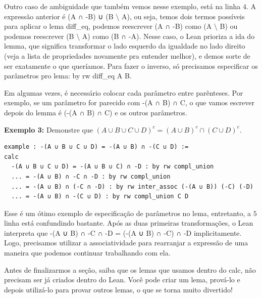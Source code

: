 Outro caso de ambiguidade que também vemos nesse exemplo, está na linha $4$. A expressão anterior é {\selectfont (A ∩ -B) ∪ (B $\setminus$ A)}, ou seja, temos dois termos possíveis para aplicar o lema {\selectfont diff\_eq}, podemos reescrever {\selectfont (A ∩ -B)} como {\selectfont (A $\setminus$ B)} ou podemos reescrever  {\selectfont (B $\setminus$ A)} como {\selectfont (B ∩ -A)}. Nesse caso, o Lean prioriza a ida do lemma, que significa transformar o lado esquerdo da igualdade no lado direito (veja a lista de propriedades novamente pra entender melhor), e demos sorte de ser exatamente o que queríamos. Para fazer o inverso, só precisamos especificar os parâmetros pro lema: {\selectfont by rw diff\_eq A B}.

Em algumas vezes, é necessário colocar cada parâmetro entre parênteses. Por exemplo, se um parâmetro for parecido com {\selectfont -(A ∩ B) ∩ C}, o que vamos escrever depois do lemma é {\selectfont (-(A ∩ B) ∩ C)} e os outros parâmetros.

\textbf{Exemplo 3:} Demonstre que $(A \cup B \cup C \cup D)^c = (A \cup B)^c \cap (C \cup D)^c$.

\begin{lstlisting}
example : -(A ∪ B ∪ C ∪ D) = -(A ∪ B) ∩ -(C ∪ D) :=
calc
  -(A ∪ B ∪ C ∪ D) = -(A ∪ B ∪ C) ∩ -D : by rw compl_union
  ... = -(A ∪ B) ∩ -C ∩ -D : by rw compl_union
  ... = -(A ∪ B) ∩ (-C ∩ -D) : by rw inter_assoc (-(A ∪ B)) (-C) (-D)
  ... = -(A ∪ B) ∩ -(C ∪ D) : by rw compl_union C D \end{lstlisting}

Esse é um ótimo exemplo de especificação de parâmetros no lema, entretanto, a $5$ linha está confundindo bastante. Após as duas primeiras transformações, o Lean interpreta que {\selectfont -(A ∪ B) ∩ -C ∩ -D = (-(A ∪ B) ∩ -C) ∩ -D} implicitamente. Logo, precisamos utilizar a associatividade para rearranjar a expressão de uma maneira que podemos continuar trabalhando com ela.

Antes de finalizarmos a seção, saiba que os lemas que usamos dentro do {\selectfont calc}, não precisam ser já criados dentro do Lean. Você pode criar um lema, prová-lo e depois utilizá-lo para provar outros lemas, o que se torna muito divertido!
